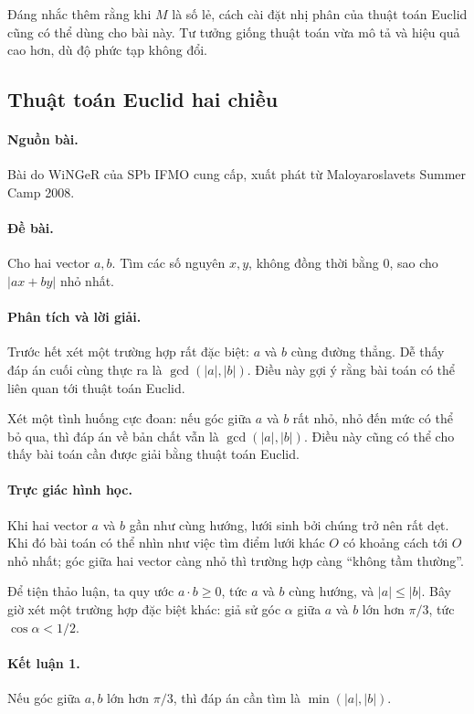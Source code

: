 \documentclass[11pt]{article}
\newcommand{\abs}[1]{\left|#1\right|}
\begin{document}
Đáng nhắc thêm rằng khi $M$ là số lẻ, cách cài đặt nhị phân của thuật toán
Euclid cũng có thể dùng cho bài này. Tư tưởng giống thuật toán vừa mô tả và
hiệu quả cao hơn, dù độ phức tạp không đổi.

\subsection{Thuật toán Euclid hai chiều}

\paragraph{Nguồn bài.} Bài do WiNGeR của SPb IFMO cung cấp, xuất phát từ
Maloyaroslavets Summer Camp 2008.

\paragraph{Đề bài.} Cho hai vector $a,b$. Tìm các số nguyên $x,y$, không đồng
thời bằng $0$, sao cho $\abs{ax+by}$ nhỏ nhất.

\paragraph{Phân tích và lời giải.}
Trước hết xét một trường hợp rất đặc biệt: $a$ và $b$ cùng đường thẳng. Dễ
thấy đáp án cuối cùng thực ra là $\gcd(\abs a,\abs b)$. Điều này gợi ý rằng
bài toán có thể liên quan tới thuật toán Euclid.

Xét một tình huống cực đoan: nếu góc giữa $a$ và $b$ rất nhỏ, nhỏ đến mức có
thể bỏ qua, thì đáp án về bản chất vẫn là $\gcd(\abs a,\abs b)$. Điều này cũng
có thể cho thấy bài toán cần được giải bằng thuật toán Euclid.

\paragraph{Trực giác hình học.}
Khi hai vector $a$ và $b$ gần như cùng hướng, lưới sinh bởi chúng trở nên rất
dẹt. Khi đó bài toán có thể nhìn như việc tìm điểm lưới khác $O$ có khoảng
cách tới $O$ nhỏ nhất; góc giữa hai vector càng nhỏ thì trường hợp càng
``không tầm thường''.

Để tiện thảo luận, ta quy ước $a\cdot b\ge 0$, tức $a$ và $b$ cùng hướng, và
$\abs a\le \abs b$. Bây giờ xét một trường hợp đặc biệt khác: giả sử góc
$\alpha$ giữa $a$ và $b$ lớn hơn $\pi/3$, tức $\cos\alpha<1/2$.

\paragraph{Kết luận 1.}
Nếu góc giữa $a,b$ lớn hơn $\pi/3$, thì đáp án cần tìm là
$\min(\abs a,\abs b)$.
\end{document}

